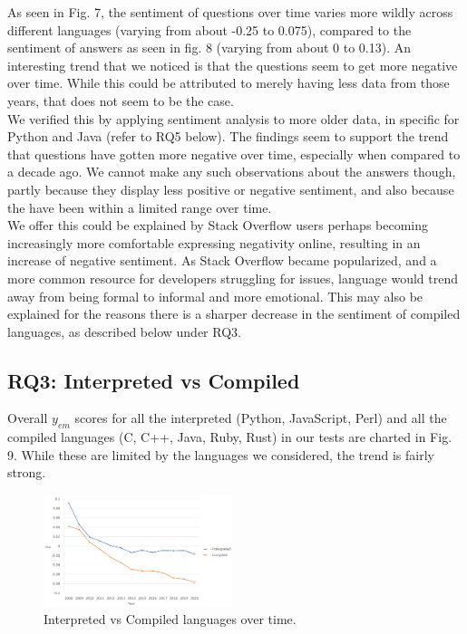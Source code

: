 \documentclass[conference]{IEEEtran}
\begin{document}
As seen in Fig. 7, the sentiment of questions over time varies more wildly across different languages (varying from about -0.25 to 0.075), compared to the sentiment of answers as seen in fig. 8 (varying from about 0 to 0.13). An interesting trend that we noticed is that the questions seem to get more negative over time. While this could be attributed to merely having less data from those years, that does not seem to be the case.\\

We verified this by applying sentiment analysis to more older data, in specific for Python and Java (refer to RQ5 below). The findings seem to support the trend that questions have gotten more negative over time, especially when compared to a decade ago. We cannot make any such observations about the answers though, partly because they display less positive or negative sentiment, and also because the have been within a limited range over time.\\

We offer this could be explained by Stack Overflow users perhaps becoming increasingly more comfortable expressing negativity online, resulting in an increase of negative sentiment. As Stack Overflow became popularized, and a more common resource for developers struggling for issues, language would trend away from being formal to informal and more emotional. This may also be explained for the reasons there is a sharper decrease in the sentiment of compiled languages, as described below under RQ3.\\


\subsection{RQ3: Interpreted vs Compiled}
Overall $y_{em}$ scores for all the interpreted (Python, JavaScript, Perl) and all the compiled languages (C, C++, Java, Ruby, Rust) in our tests are charted in Fig. 9. While these are limited by the languages we considered, the trend is fairly strong. \\

\begin{figure}[htbp]
\centerline{\includegraphics[width=0.49\textwidth]{figures/time_interpreted_compiled.png}}
\caption{Interpreted vs Compiled languages over time.}
\label{fig}
\end{figure}
\end{document}
